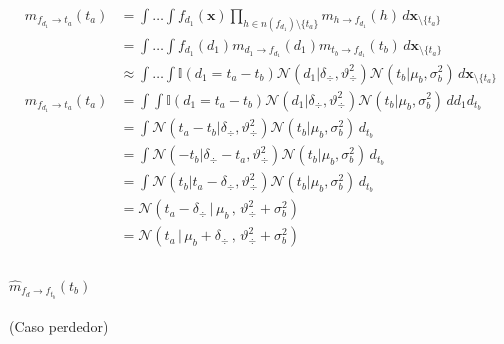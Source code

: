 \documentclass[11pt,twoside,spanish]{report} %
\begin{document}
\begin{equation}\label{eq:^m_fd_ta}
	\begin{split}
		m_{f_{d_1} \rightarrow t_a}(t_a) &= \int \dots \int f_{d_1}(\textbf{x}) \prod_{h \in n(f_{d_1}) \setminus \{t_a\} } m_{h \rightarrow f_{d_1}}(h) \, d\textbf{x}_{\setminus \{t_a\} }  \\
		&= \int \dots \int f_{d_1}(d_1)m_{d_1 \rightarrow f_{d_1}}(d_1) m_{t_b \rightarrow f_{d_1}}(t_b)  \, d\textbf{x}_{\setminus \{t_a\} }  \\
		&\approx  \int \dots \int \mathbb{I}(d_1 = t_a - t_b) \mathcal{N}(d_1 | \delta_{\div}, \vartheta_{\div}^2) \mathcal{N}(t_b | \mu_b , \sigma_b^2 )  \, d\textbf{x}_{\setminus \{t_a\} } \\[0.1cm]
		\widehat{m}_{f_{d_1} \rightarrow t_a}(t_a)  & = \int \int \mathbb{I}(d_1 = t_a - t_b) \mathcal{N}(d_1 | \delta_{\div}, \vartheta_{\div}^2) \mathcal{N}(t_b | \mu_b , \sigma_b^2 )  \, d{d_1} d_{t_b} \\
		& = \int  \mathcal{N}(t_a - t_b | \delta_{\div}, \vartheta_{\div}^2) \mathcal{N}(t_b | \mu_b , \sigma_b^2 )  \, d_{t_b} \\
		&=\int  \mathcal{N}( - t_b | \delta_{\div} - t_a, \vartheta_{\div}^2) \mathcal{N}(t_b | \mu_b , \sigma_b^2 )  \, d_{t_b} \\
		& = \int  \mathcal{N}( t_b | t_a - \delta_{\div}, \vartheta_{\div}^2) \mathcal{N}(t_b | \mu_b , \sigma_b^2 )  \,  d_{t_b} \\
		&=\mathcal{N}(t_a - \delta_{\div} \, | \, \mu_b \, , \, \vartheta_{\div}^2 + \sigma_b^2) \\
		&= \mathcal{N}(t_a \, | \, \mu_b + \delta_{\div} \, , \, \vartheta_{\div}^2 + \sigma_b^2) \\
	\end{split}
\end{equation}


\paragraph{$\widehat{m}_{f_d \rightarrow f_{t_b}}(t_b)$} (Caso perdedor)
\end{document}
